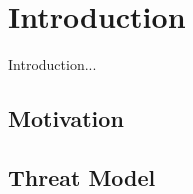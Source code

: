 \chapter{Introduction}
\label{cap:introduction}

Introduction...

\section{Motivation}

\section{Threat Model}
